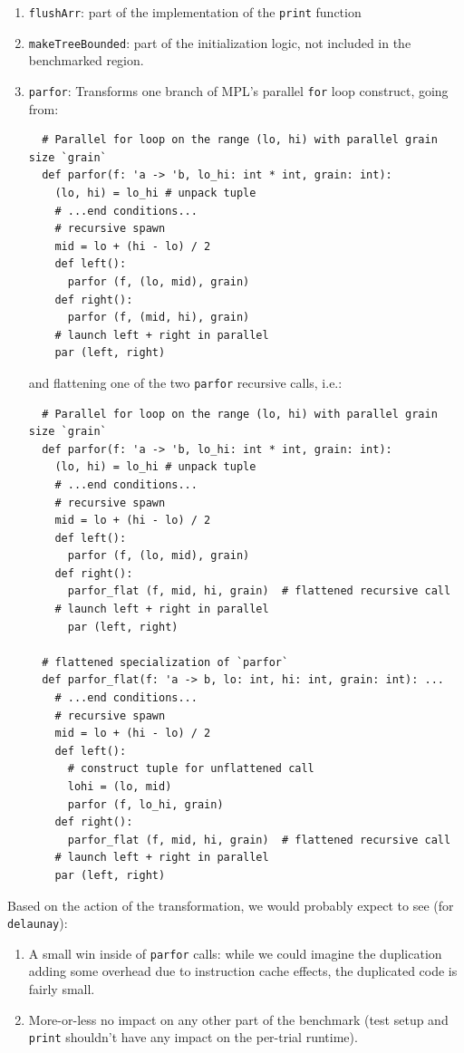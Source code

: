 \begin{enumerate}
\item \texttt{flushArr}: part of the implementation of the \texttt{print} function
\item \texttt{makeTreeBounded}: part of the initialization logic, not included
  in the benchmarked region.
\item \texttt{parfor}: Transforms one branch of MPL's parallel \texttt{for} loop
  construct, going from:

\begin{verbatim}
  # Parallel for loop on the range (lo, hi) with parallel grain size `grain`
  def parfor(f: 'a -> 'b, lo_hi: int * int, grain: int):
    (lo, hi) = lo_hi # unpack tuple
    # ...end conditions...
    # recursive spawn
    mid = lo + (hi - lo) / 2
    def left():
      parfor (f, (lo, mid), grain)
    def right():
      parfor (f, (mid, hi), grain)
    # launch left + right in parallel
    par (left, right)
\end{verbatim}
and flattening one of the two \texttt{parfor} recursive calls, i.e.:
\begin{verbatim}
  # Parallel for loop on the range (lo, hi) with parallel grain size `grain`
  def parfor(f: 'a -> 'b, lo_hi: int * int, grain: int):
    (lo, hi) = lo_hi # unpack tuple
    # ...end conditions...
    # recursive spawn
    mid = lo + (hi - lo) / 2
    def left():
      parfor (f, (lo, mid), grain)
    def right():
      parfor_flat (f, mid, hi, grain)  # flattened recursive call
    # launch left + right in parallel
      par (left, right)

  # flattened specialization of `parfor`
  def parfor_flat(f: 'a -> b, lo: int, hi: int, grain: int): ...
    # ...end conditions...
    # recursive spawn
    mid = lo + (hi - lo) / 2
    def left():
      # construct tuple for unflattened call
      lohi = (lo, mid)
      parfor (f, lo_hi, grain)
    def right():
      parfor_flat (f, mid, hi, grain)  # flattened recursive call
    # launch left + right in parallel
    par (left, right)
\end{verbatim}
\end{enumerate}

Based on the action of the transformation, we would probably expect to see (for
\texttt{delaunay}):
\begin{enumerate}
\item A small win inside of \texttt{parfor} calls: while we could imagine the
  duplication adding some overhead due to instruction cache effects, the
  duplicated code is fairly small.

\item More-or-less no impact on any other part of the benchmark (test setup and
  \texttt{print} shouldn't have any impact on the per-trial runtime).
\end{enumerate}

